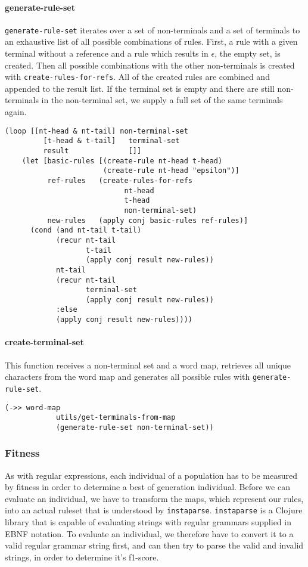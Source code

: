 \documentclass[runningheads]{llncs}
\begin{document}
\paragraph{generate-rule-set}
\texttt{generate-rule-set} iterates over a set of non-terminals and a set of terminals to an exhaustive list of all possible combinations of rules. First, a rule with a given terminal without a reference and a rule which results in $\epsilon$, the empty set, is created. Then all possible combinations with the other non-terminals is created with \texttt{create-rules-for-refs}. All of the created rules are combined and appended to the result list. If the terminal set is empty and there are still non-terminals in the non-terminal set, we supply a full set of the same terminals again.
\begin{lstlisting}
(loop [[nt-head & nt-tail] non-terminal-set
         [t-head & t-tail]   terminal-set
         result              []]
    (let [basic-rules [(create-rule nt-head t-head)
                       (create-rule nt-head "epsilon")]
          ref-rules   (create-rules-for-refs
                            nt-head
                            t-head
                            non-terminal-set)
          new-rules   (apply conj basic-rules ref-rules)]
      (cond (and nt-tail t-tail)
            (recur nt-tail
                   t-tail
                   (apply conj result new-rules))
            nt-tail
            (recur nt-tail
                   terminal-set
                   (apply conj result new-rules))
            :else
            (apply conj result new-rules))))
\end{lstlisting}

\paragraph{create-terminal-set}
This function receives a non-terminal set and a word map, retrieves all unique characters from the word map and generates all possible rules with \texttt{generate-rule-set}.
\begin{lstlisting}
(->> word-map
            utils/get-terminals-from-map
            (generate-rule-set non-terminal-set))
\end{lstlisting}

\subsubsection{Fitness}
As with regular expressions, each individual of a population has to be measured by fitness in order to determine a best of generation individual. Before we can evaluate an individual, we have to transform the maps, which represent our rules, into an actual ruleset that is understood by \texttt{instaparse}. \texttt{instaparse} is a Clojure library that is capable of evaluating strings with regular grammars supplied in EBNF notation. To evaluate an individual, we therefore have to convert it to a valid regular grammar string first, and can then try to parse the valid and invalid strings, in order to determine it's f1-score.
\end{document}
